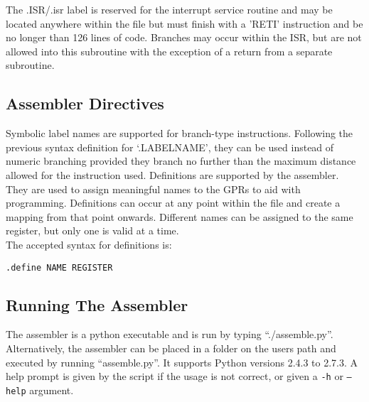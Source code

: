 \noindent The .ISR/.isr label is reserved for the interrupt service routine and may be located anywhere within the file but must finish with a 'RETI' instruction and be no longer than 126 lines of code. Branches may occur within the ISR, but are not allowed into this subroutine with the exception of a return from a separate subroutine.\\

\subsection{Assembler Directives}
Symbolic label names are supported for branch-type instructions. Following the previous syntax definition for `.LABELNAME', they can be used instead of numeric branching provided they branch no further than the maximum distance allowed for the instruction used. 
Definitions are supported by the assembler. 
They are used to assign meaningful names to the GPRs to aid with programming.
Definitions can occur at any point within the file and create a mapping from that point onwards. 
Different names can be assigned to the same register, but only one is valid at a time. \\


\noindent The accepted syntax for definitions is:

\begin{center}\texttt{.define NAME REGISTER}\end{center}

\subsection{Running The Assembler}\label{sect:runningassembler}

The assembler is a python executable and is run by typing ``./assemble.py''. 
Alternatively, the assembler can be placed in a folder on the users path and executed by running ``assemble.py''.
It supports Python versions 2.4.3 to 2.7.3.
A help prompt is given by the script if the usage is not correct, or given a \texttt{-h} or \texttt{--help} argument. 

